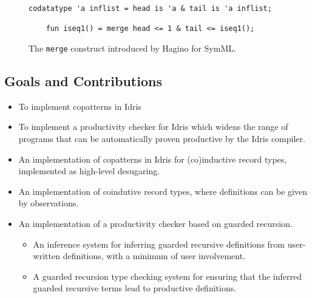 
\begin{figure}[H]
  \centering
  \begin{lstlisting}[mathescape]
    codatatype 'a inflist = head is 'a & tail is 'a inflist;

    fun iseq1() = merge head <= 1 & tail <= iseq1();
  \end{lstlisting}
  \caption{The \texttt{merge} construct introduced by Hagino for SymML.}
\end{figure}


\subsection{Goals and Contributions}

\begin{itemize}
\item To implement copatterns in Idris
\item To implement a productivity checker for Idris which widens the range of
  programs that can be automatically proven productive by the Idris compiler.
\end{itemize}

\begin{itemize}
\item An implementation of copatterns in Idris for (co)inductive record types,
  implemented as high-level desugaring.
\item An implementation of coindutive record types, where definitions can be
  given by observations.
\item An implementation of a productivity checker based on guarded recursion. 
  \begin{itemize}
    \item An inference system for inferring guarded recursive definitions
      from user-written definitions, with a minimum of user involvement.
    \item A guarded recursion type checking system for ensuring that the
      inferred guarded recursive terms lead to productive definitions.
  \end{itemize}
\end{itemize}
